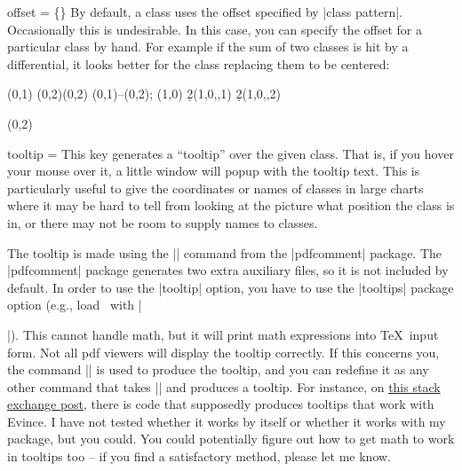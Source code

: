 \begin{sseqdata}[name = basic, cohomological Serre grading]
\begin{key}{offset = \{\}}%
By default, a class uses the offset specified by |class pattern|. Occasionally
this is undesirable. In this case, you can specify the offset for a particular
class by hand. For example if the sum of two classes is hit by a differential,
it looks better for the class replacing them to be centered:
\begin{codeexample}[width = 9cm]
\begin{sseqdata}[ name = offset example,
    xscale = 0.7,
    Adams grading,
    class placement transform = {scale = 1.8} ]
\class(0,1)
\class(0,2)\class(0,2)
\draw(0,1)--(0,2);
\class(1,0)
\d2(1,0,,1)
\replacetarget
\d2(1,0,,2)
\end{sseqdata}
\printpage[name = offset example, page=2]
\printpage[name = offset example, page=3]
\begin{sseqpage}[name = offset example, page=3]
\classoptions[offset = {(0,0)}](0,2)
\end{sseqpage}
\end{codeexample}
\end{key}

\begin{key}{tooltip = }%
This key generates a ``tooltip'' over the given class. That is, if you hover
your mouse over it, a little window will popup with the tooltip text. This is
particularly useful to give the coordinates or names of classes in large charts
where it may be hard to tell from looking at the picture what position the class
is in, or there may not be room to supply names to classes.

The tooltip is made using the |\pdftooltip| command from the |pdfcomment|
package. The |pdfcomment| package generates two extra auxiliary files, so it is
not included by default. In order to use the |tooltip| option, you have to use
the |tooltips| package option (e.g., load \sseqpages\ with
|\usepackage[tooltips]{spectralsequences}|). This cannot handle math, but it
will print math expressions into \TeX\ input form. Not all pdf viewers will
display the tooltip correctly. If this concerns you, the command |\sseqtooltip|
is used to produce the tooltip, and you can redefine it as any other command
that takes |\sseqtooltip| and produces a tooltip.
For instance, on \href{https://tex.stackexchange.com/a/164186/23866}{this stack
exchange post}, there is code that supposedly produces tooltips that work with
Evince. I have not tested whether it works by itself or whether it works with my
package, but you could. You could potentially figure out how to get math to work
in tooltips too -- if you find a satisfactory method, please let me know.


\end{key}
\end{sseqdata}
